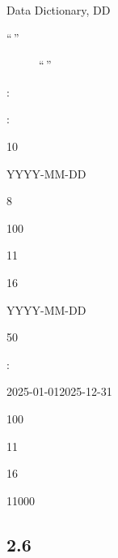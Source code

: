 Data Dictionary, DD

\begin{description}
\item[``\,'']
``\,''
\item[:]
\end{description}

:

10

YYYY-MM-DD

8

100

11

16

YYYY-MM-DD

50

:

2025-01-012025-12-31

100

11

16

11000

\subsection{2.6}\label{section-38}